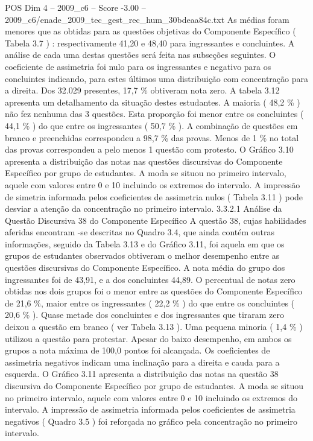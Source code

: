 \begin{textsample}{POS Dim 4 – 2009\_c6 – Score -3.00 – 2009\_c6/enade\_2009\_tec\_gest\_rec\_hum\_30bdeaa84c.txt}
As médias foram menores que as obtidas para as questões objetivas do Componente Específico ( Tabela 3.7 ) : respectivamente 41,20 e 48,40 para ingressantes e concluintes.
A análise de cada uma destas questões será feita nas subseções seguintes.
O coeficiente de assimetria foi nulo para os ingressantes e negativo para os concluintes indicando, para estes últimos uma distribuição com concentração para a direita.
Dos 32.029 presentes, 17,7 \% obtiveram nota zero.
A tabela 3.12 apresenta um detalhamento da situação destes estudantes.
A maioria ( 48,2 \% ) não fez nenhuma das 3 questões.
Esta proporção foi menor entre os concluintes ( 44,1 \% ) do que entre os ingressantes ( 50,7 \% ).
A combinação de questões em branco e preenchidas correspondeu a 98,7 \% das provas.
Menos de 1 \% no total das provas correspondeu a pelo menos 1 questão com protesto.
O Gráfico 3.10 apresenta a distribuição das notas nas questões discursivas do Componente Específico por grupo de estudantes.
A moda se situou no primeiro intervalo, aquele com valores entre 0 e 10 incluindo os extremos do intervalo.
A impressão de simetria informada pelos coeficientes de assimetria nulos ( Tabela 3.11 ) pode desviar a atenção da concentração no primeiro intervalo. 3.3.2.1 Análise da Questão Discursiva 38 do Componente Específico A questão 38, cujas habilidades aferidas encontram -se descritas no Quadro 3.4, que ainda contém outras informações, seguido da Tabela 3.13 e do Gráfico 3.11, foi aquela em que os grupos de estudantes observados obtiveram o melhor desempenho entre as questões discursivas do Componente Específico.
A nota média do grupo dos ingressantes foi de 43,91, e a dos concluintes 44,89.
O percentual de notas zero obtidas nos dois grupos foi o menor entre as questões do Componente Específico de 21,6 \%, maior entre os ingressantes ( 22,2 \% ) do que entre os concluintes ( 20,6 \% ).
Quase metade dos concluintes e dos ingressantes que tiraram zero deixou a questão em branco ( ver Tabela 3.13 ).
Uma pequena minoria ( 1,4 \% ) utilizou a questão para protestar.
Apesar do baixo desempenho, em ambos os grupos a nota máxima de 100,0 pontos foi alcançada.
Os coeficientes de assimetria negativos indicam uma inclinação para a direita e cauda para a esquerda.
O Gráfico 3.11 apresenta a distribuição das notas na questão 38 discursiva do Componente Específico por grupo de estudantes.
A moda se situou no primeiro intervalo, aquele com valores entre 0 e 10 incluindo os extremos do intervalo.
A impressão de assimetria informada pelos coeficientes de assimetria negativos ( Quadro 3.5 ) foi reforçada no gráfico pela concentração no primeiro intervalo.

\end{textsample}
